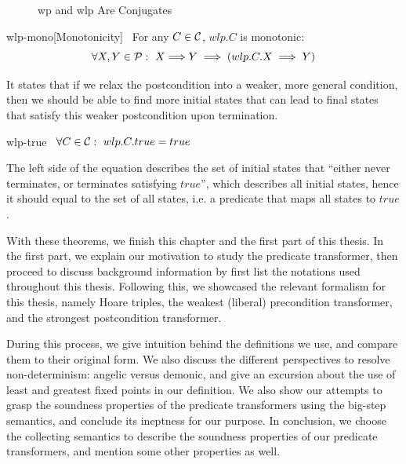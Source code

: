 \begin{figure}[ht!]\centering
  
  \caption{wp and wlp Are Conjugates}
  \label{fig:wp-wlp-complement}
\end{figure}


\begin{theorem}{wlp-mono}[Monotonicity]~{\normalfont\cite{dijkstra90}} For any $C\in\mathcal{C}$, $wlp.C$ is monotonic:
  \[\forall X, Y \in\P:\ X{\implies} Y \implies (wlp.C.X\implies Y)\]
\end{theorem}
It states that if we relax the postcondition into a weaker, more general condition, then we should be able to find more initial states that can lead to final states that satisfy this weaker postcondition upon termination. 

\begin{theorem}{wlp-true}~{\normalfont\cite{dijkstra90}}
  $\forall C\in\mathcal{C}:\ wlp.C.true = true$
\end{theorem}
The left side of the equation describes the set of initial states that ``either never terminates, or terminates satisfying $true$'', which describes all initial states, hence it should equal to the set of all states, i.e. a predicate that maps all states to $true$.

With these theorems, we finish this chapter and the first part of this thesis. 
In the first part, we explain our motivation to study the predicate transformer, then proceed to discuss background information by first list the notations used throughout this thesis. 
Following this, we showcased the relevant formalism for this thesis, namely Hoare triples, the weakest (liberal) precondition transformer, and the strongest postcondition transformer. 

During this process, we give intuition behind the definitions we use, and compare them to their original form. 
We also discuss the different perspectives to resolve non-determinism: angelic versus demonic, and give an excursion about the use of least and greatest fixed points in our definition. 
We also show our attempts to grasp the soundness properties of the predicate transformers using the big-step semantics, and conclude its ineptness for our purpose. 
In conclusion, we choose the collecting semantics to describe the soundness properties of our predicate transformers, and mention some other properties as well. 

